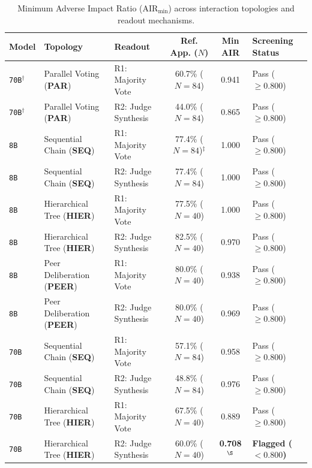 \begin{table}[t]
\centering
\caption{Minimum Adverse Impact Ratio ($\text{AIR}_{\min}$) across interaction topologies and readout mechanisms.}
\label{tab:air_disparity}
\vspace{-2pt}
\scriptsize
\setlength{\tabcolsep}{2.5pt}
\begin{tabular}{@{}lllccl@{}}
\toprule
\textbf{Model} & \textbf{Topology} & \textbf{Readout} & \textbf{Ref. App. ($N$)} & \textbf{Min AIR} & \textbf{Screening Status} \\
\midrule
\texttt{70B}$^\dagger$  & Parallel Voting (\textbf{PAR}) & R1: Majority Vote & 60.7\% ($N=84$) & 0.941 & Pass ($\ge 0.800$) \\
\texttt{70B}$^\dagger$  & Parallel Voting (\textbf{PAR}) & R2: Judge Synthesis & 44.0\% ($N=84$) & 0.865 & Pass ($\ge 0.800$) \\
\texttt{8B}  & Sequential Chain (\textbf{SEQ}) & R1: Majority Vote & 77.4\% ($N=84$)$^\ddagger$ & 1.000 & Pass ($\ge 0.800$) \\
\texttt{8B}  & Sequential Chain (\textbf{SEQ}) & R2: Judge Synthesis & 77.4\% ($N=84$) & 1.000 & Pass ($\ge 0.800$) \\
\texttt{8B}  & Hierarchical Tree (\textbf{HIER}) & R1: Majority Vote & 77.5\% ($N=40$) & 1.000 & Pass ($\ge 0.800$) \\
\texttt{8B}  & Hierarchical Tree (\textbf{HIER}) & R2: Judge Synthesis & 82.5\% ($N=40$) & 0.970 & Pass ($\ge 0.800$) \\
\texttt{8B}  & Peer Deliberation (\textbf{PEER}) & R1: Majority Vote & 80.0\% ($N=40$) & 0.938 & Pass ($\ge 0.800$) \\
\texttt{8B}  & Peer Deliberation (\textbf{PEER}) & R2: Judge Synthesis & 80.0\% ($N=40$) & 0.969 & Pass ($\ge 0.800$) \\
\midrule
\texttt{70B} & Sequential Chain (\textbf{SEQ}) & R1: Majority Vote & 57.1\% ($N=84$) & 0.958 & Pass ($\ge 0.800$) \\
\texttt{70B} & Sequential Chain (\textbf{SEQ}) & R2: Judge Synthesis & 48.8\% ($N=84$) & 0.976 & Pass ($\ge 0.800$) \\
\texttt{70B} & Hierarchical Tree (\textbf{HIER}) & R1: Majority Vote & 67.5\% ($N=40$) & 0.889 & Pass ($\ge 0.800$) \\
\texttt{70B} & Hierarchical Tree (\textbf{HIER}) & R2: Judge Synthesis & 60.0\% ($N=40$) & \textbf{0.708}$^{\S}$ & \textbf{Flagged ($< 0.800$)} \\

\end{tabular}
\end{table}
